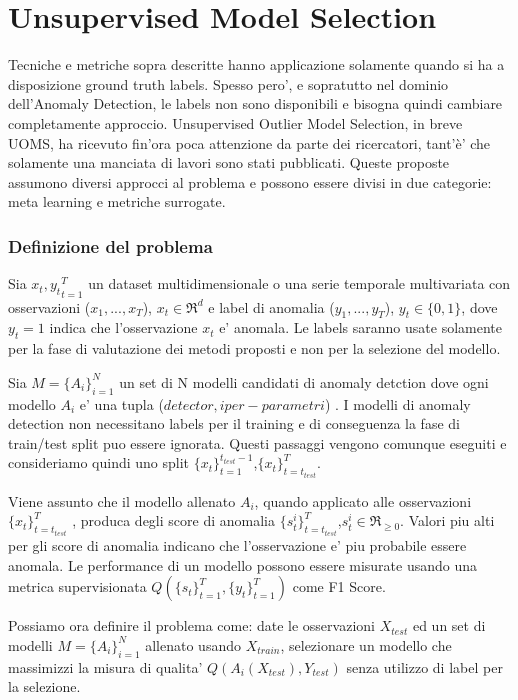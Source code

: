 \section{Unsupervised Model Selection}
Tecniche e metriche sopra descritte hanno applicazione solamente quando si ha a disposizione ground truth labels. Spesso pero', e sopratutto nel dominio dell'Anomaly Detection, le labels non sono disponibili e bisogna quindi cambiare completamente approccio. 
Unsupervised Outlier Model Selection, in breve UOMS, ha ricevuto fin'ora poca attenzione da parte dei ricercatori, tant'è' che solamente una manciata di lavori sono stati pubblicati. Queste proposte assumono diversi approcci al problema e possono essere divisi in due categorie: meta learning e metriche surrogate.

\subsubsection{Definizione del problema}
Sia \({x_t,y_t}^T_{t=1}\) un dataset multidimensionale o una serie temporale multivariata con osservazioni (\(x_1,...,x_T\)), \(x_t\in\Re^d\) e label di anomalia (\(y_1,...,y_T\)), \(y_t \in \{0,1\}\), dove \(y_t=1\) indica che l'osservazione \(x_t\) e' anomala. Le labels saranno usate solamente per la fase di valutazione dei metodi proposti e non per la selezione del modello.

Sia \(M=\{A_i\}^N_{i=1}\) un set di N modelli candidati di anomaly detction dove ogni modello \(A_i\) e' una tupla (\(detector, iper-parametri\)) .
I modelli di anomaly detection non necessitano labels per il training e di conseguenza la fase di train/test split puo essere ignorata.  Questi passaggi vengono comunque eseguiti e consideriamo quindi uno split \(\{x_t\}_{t=1}^{t_{test}-1}\),\(\{x_t\}^{T}_{t=t_{test}}\).

Viene assunto che il modello allenato \(A_i\), quando applicato alle osservazioni \(\{x_t\}^{T}_{t=t_{test}}\) , produca degli score di anomalia \(\{s_t^i\}_{t=t_{test}}^T\),\(s^i_t\in\Re_{\geq0}\). Valori piu alti per gli score di anomalia indicano che l'osservazione e' piu probabile essere anomala.
Le performance di un modello possono essere misurate usando una metrica supervisionata \(Q(\{s_t\}^T_{t=1},\{y_t\}^T_{t=1})\) come F1 Score.

Possiamo ora definire il problema come: date le osservazioni \(X_{test}\) ed un set di modelli \(M=\{A_i\}^N_{i=1}\) allenato usando \(X_{train}\), selezionare un modello che massimizzi la misura di qualita' \(Q(A_i(X_{test}),Y_{test})\) senza utilizzo di label per la selezione.

